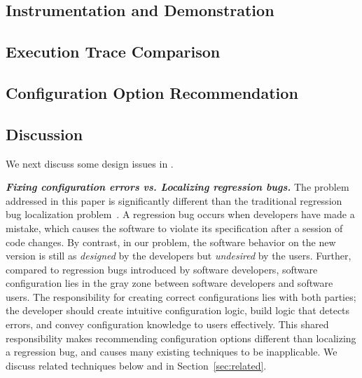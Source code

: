 \subsection{Instrumentation and Demonstration}
\label{sec:profiling}



\subsection{Execution Trace Comparison}
\label{sec:comparison}



\subsection{Configuration Option Recommendation}
\label{sec:rootcause}



\subsection{Discussion}
\label{sec:tech_discuss}

We next discuss some design issues in \ourtool.

\vspace{1mm}

\noindent \textbf{\textit{Fixing configuration errors 
vs. Localizing regression bugs.}}
The problem addressed in this paper is significantly different
than the traditional regression bug localization problem~\cite{dd, autoflow}.
A regression bug occurs when developers have made a mistake,
which causes the software to violate its specification after a session of code changes.
By contrast, in our problem, the software behavior on the new version
is still as \textit{designed} by the developers
but \textit{undesired} by the users. 
Further, compared to
regression bugs introduced by software developers,
software configuration lies in the gray zone between
software developers and software users. The responsibility for creating
correct configurations lies with both parties; the developer should create
intuitive configuration logic, build logic that detects
errors, and convey configuration knowledge to users
effectively. This shared responsibility makes recommending configuration options
different than localizing a regression bug, and causes many existing
techniques to be inapplicable. We discuss related techniques below
and in Section~\ref{sec:related}.


